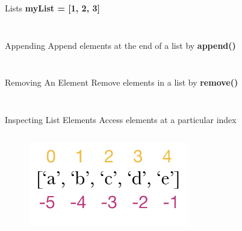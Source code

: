         \begin{frame}{Lists}
                \Huge {\textbf{myList = [1, 2, 3]}}
                \pause  
                \inputminted[frame=single,framesep=2pt]{python3}{code-examples/intro_lists.py}
                \pause  
                \inputminted[frame=single,framesep=2pt]{python3}{code-examples/mixed_list.py}
        \end{frame}
        \begin{frame}{Appending}
            Append elements at the end of a list by \textbf{append()}
            \bigskip
            \inputminted[frame=single,framesep=2pt]{python3}{code-examples/append_list.py}
            \pause  
            \inputminted[frame=single,framesep=2pt]{python3}{code-examples/append_list2.py}
        \end{frame}
        \begin{frame}{Removing An Element}
            Remove elements in a list by \textbf{remove()}
            \bigskip
            \inputminted[frame=single,framesep=2pt]{python3}{code-examples/remove.py}
            \pause  
            \inputminted[frame=single,framesep=2pt]{python3}{code-examples/remove2.py}
        \end{frame}
        \begin{frame}{Inspecting List Elements}
            Access elements at a particular index
            \begin{columns}
               \begin{column}{0.5\textwidth}
                \vspace{-5mm}
                \begin{figure}[H]
                    \bigskip
                    \includegraphics[width=70mm]{code-examples/index.png}
                    \end{figure}    
               \end{column}
              \pause 
               \begin{column}{0.5\textwidth}
                \inputminted[frame=single,framesep=2pt]{python3}{code-examples/index.py}
               \end{column} 
            \end{columns}
        \end{frame}
